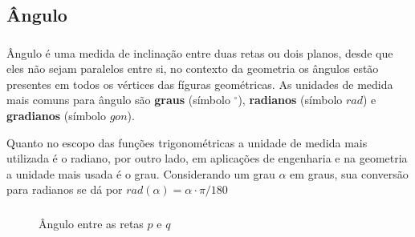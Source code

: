 \documentclass{beamer}
\begin{document}
\subsection{Ângulo}

\begin{frame}\frametitle{\subsecname}
    Ângulo é uma medida de inclinação entre duas retas ou dois planos, desde que eles não sejam paralelos entre si, no
    contexto da geometria os ângulos estão presentes em todos os vértices das fíguras geométricas.
    As unidades de medida mais comuns para ângulo são \textbf{graus} (símbolo $^{\circ}$), \textbf{radianos} (símbolo $rad$) e \textbf{gradianos} (símbolo $gon$).

    Quanto no escopo das funções trigonométricas a unidade de medida mais utilizada é o radiano, por outro lado,
    em aplicações de engenharia e na geometria a unidade mais usada é o grau. Considerando um grau $\alpha$ em graus,
    sua conversão para radianos se dá por $rad(\alpha) = \alpha\cdot\pi/180$

\end{frame}


\begin{frame}[fragile]\frametitle{\subsecname}
    \begin{figure}[H]
        \centering
        \caption{Ângulo entre as retas $p$ e $q$}
    \end{figure}
\end{frame}

\end{document}
